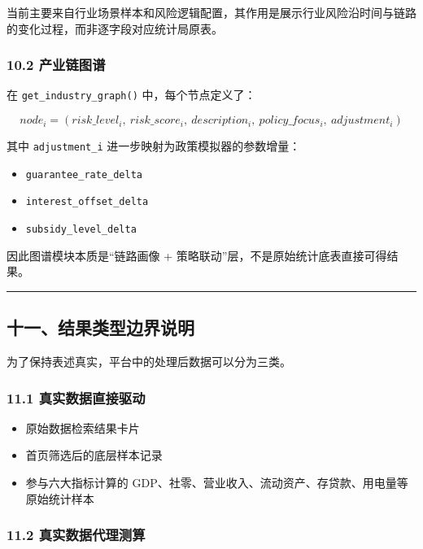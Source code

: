 \documentclass[
]{article}
\providecommand{\tightlist}{%
  \setlength{\itemsep}{0pt}\setlength{\parskip}{0pt}}
\begin{document}
当前主要来自行业场景样本和风险逻辑配置，其作用是展示行业风险沿时间与链路的变化过程，而非逐字段对应统计局原表。

\subsubsection{10.2 产业链图谱}\label{ux4ea7ux4e1aux94feux56feux8c31}

在 \texttt{get\_industry\_graph()} 中，每个节点定义了：

\[
node_i = (risk\_level_i,\ risk\_score_i,\ description_i,\ policy\_focus_i,\ adjustment_i)
\]

其中 \texttt{adjustment\_i} 进一步映射为政策模拟器的参数增量：

\begin{itemize}
\tightlist
\item
  \texttt{guarantee\_rate\_delta}
\item
  \texttt{interest\_offset\_delta}
\item
  \texttt{subsidy\_level\_delta}
\end{itemize}

因此图谱模块本质是``链路画像 +
策略联动''层，不是原始统计底表直接可得结果。

\begin{center}\rule{0.5\linewidth}{0.5pt}\end{center}

\subsection{十一、结果类型边界说明}\label{ux5341ux4e00ux7ed3ux679cux7c7bux578bux8fb9ux754cux8bf4ux660e}

为了保持表述真实，平台中的处理后数据可以分为三类。

\subsubsection{11.1
真实数据直接驱动}\label{ux771fux5b9eux6570ux636eux76f4ux63a5ux9a71ux52a8}

\begin{itemize}
\tightlist
\item
  原始数据检索结果卡片
\item
  首页筛选后的底层样本记录
\item
  参与六大指标计算的
  GDP、社零、营业收入、流动资产、存贷款、用电量等原始统计样本
\end{itemize}

\subsubsection{11.2
真实数据代理测算}\label{ux771fux5b9eux6570ux636eux4ee3ux7406ux6d4bux7b97}
\end{document}
